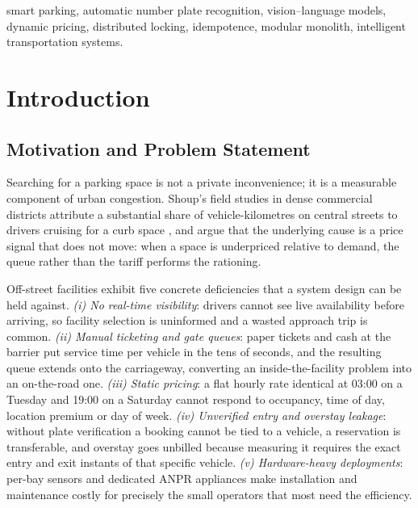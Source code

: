 \documentclass[journal,onecolumn,11pt]{IEEEtran}
\begin{document}
\begin{IEEEkeywords}
smart parking, automatic number plate recognition, vision--language models,
dynamic pricing, distributed locking, idempotence, modular monolith,
intelligent transportation systems.
\end{IEEEkeywords}

\section{Introduction}
\label{sec:intro}

\subsection{Motivation and Problem Statement}

Searching for a parking space is not a private inconvenience; it is a
measurable component of urban congestion. Shoup's field studies in dense
commercial districts attribute a substantial share of vehicle-kilometres on
central streets to drivers cruising for a curb space
\cite{shoup2006cruising,shoup2005highcost}, and argue that the underlying cause
is a price signal that does not move: when a space is underpriced relative to
demand, the queue rather than the tariff performs the rationing.

Off-street facilities exhibit five concrete deficiencies that a system design
can be held against. \emph{(i) No real-time visibility}: drivers cannot see
live availability before arriving, so facility selection is uninformed and a
wasted approach trip is common. \emph{(ii) Manual ticketing and gate queues}:
paper tickets and cash at the barrier put service time per vehicle in the tens
of seconds, and the resulting queue extends onto the carriageway, converting an
inside-the-facility problem into an on-the-road one. \emph{(iii) Static pricing}:
a flat hourly rate identical at 03:00 on a Tuesday and 19:00 on a Saturday
cannot respond to occupancy, time of day, location premium or day of week.
\emph{(iv) Unverified entry and overstay leakage}: without plate verification a
booking cannot be tied to a vehicle, a reservation is transferable, and
overstay goes unbilled because measuring it requires the exact entry and exit
instants of that specific vehicle. \emph{(v) Hardware-heavy deployments}: per-bay
sensors and dedicated ANPR appliances make installation and maintenance costly
for precisely the small operators that most need the efficiency.
\end{document}
